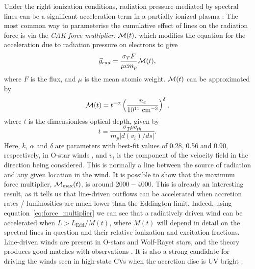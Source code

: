 Under the right ionization conditions, radiation pressure mediated by spectral lines
can be a significant  acceleration term in 
a partially ionized plasma \citep[][hereafter CAK]{CAK75}. 
The most common way to parameterise the cumulative
effect of lines on the radiation force is via the 
{\em CAK force multiplier}, ${\cal M}(t)$,
which modifies the equation for the acceleration due to radiation pressure on electrons
to give \citep[][CAK]{castor1974}
\begin{equation}
\label{eq:force_multiplier}
\vec{g}_{rad} = \frac{\sigma_T F}{\mu c m_p} {\cal M}(t),
\end{equation}
where $F$ is the flux, and $\mu$ is the mean atomic weight.
${\cal M}(t)$ can be approximated by \citep{abbott1982}
\begin{equation}
\label{eq:force_multiplier2}
{\cal M}(t) = t^{-\alpha} 
\left( \frac{n_e}{10^{11}~{\rm cm}^{-3}}\right)^\delta,
\end{equation}
where $t$ is the dimensionless optical depth, given by
\begin{equation}
t = \frac{\sigma_T \rho v_{th}}{m_p | d(v_i) / ds |}.
\end{equation}
Here, $k$, $\alpha$ and $\delta$ are parameters
with best-fit 
values of 0.28, 0.56 and 0.90, respectively, in O-star winds \citep{abbott1982},
and $v_i$ is the component of the velocity field in the direction
being considered. This is normally a line between the source of radiation and any
given location in the wind. 
It is possible to show \citep[CAK, ][]{owocki1988} that the maximum force multiplier,
${\cal M}_{\mathrm{max}}(t)$,
is around $2000-4000$. This is already an interesting result, as it tells us
that line-driven outflows can be accelerated when accretion rates / luminosities
are much lower than the Eddington limit. Indeed, using 
equation~\ref{eq:force_multiplier} we can see that a radiatively driven wind 
can be accelerated when $L > L_{\mathrm{Edd}} / M(t)$, where $M(t)$ will depend in detail on
the spectral lines in question and their relative ionization and excitation fractions.
Line-driven winds are present in O-stars and Wolf-Rayet stars, and the theory
produces good matches with observations 
\citep[e.g.][]{friend1986,pauldrach1986,pauldrach1994,hamann2008}. 
It is also a strong candidate for driving
the winds seen in high-state CVs when the accretion disc is UV bright 
\citep[][see also section~\ref{sec:proga}]{pereyra1997,proga1998,proga2005}.

